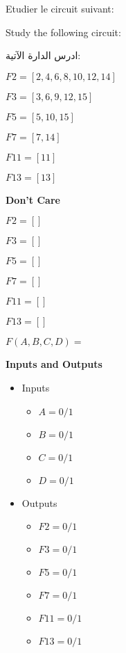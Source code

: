 Etudier le circuit suivant:



Study the following circuit:

\begin{arab}[utf]
ادرس الدارة الآتية:
\end{arab}

 

$F2 = [2, 4, 6, 8, 10, 12, 14]$



$F3 = [3, 6, 9, 12, 15]$



$F5 = [5, 10, 15]$



$F7 = [7, 14]$



$F11 = [11]$



$F13 = [13]$



\textbf{Don't Care }
 
$F2 = []$

$F3 = []$

$F5 = []$

$F7 = []$

$F11 = []$

$F13 = []$



$F(A,B,C,D) =$





\textbf{Inputs and Outputs }

\begin{itemize}
\item Inputs

    \begin{itemize}
    
        \item $A = 0 /1 $
    
        \item $B = 0 /1 $
    
        \item $C = 0 /1 $
    
        \item $D = 0 /1 $
    
    \end{itemize}
\item Outputs
    \begin{itemize}
    
        \item $F2 = 0 /1 $
    
        \item $F3 = 0 /1 $
    
        \item $F5 = 0 /1 $
    
        \item $F7 = 0 /1 $
    
        \item $F11 = 0 /1 $
    
        \item $F13 = 0 /1 $
    
    \end{itemize}
\end{itemize}

